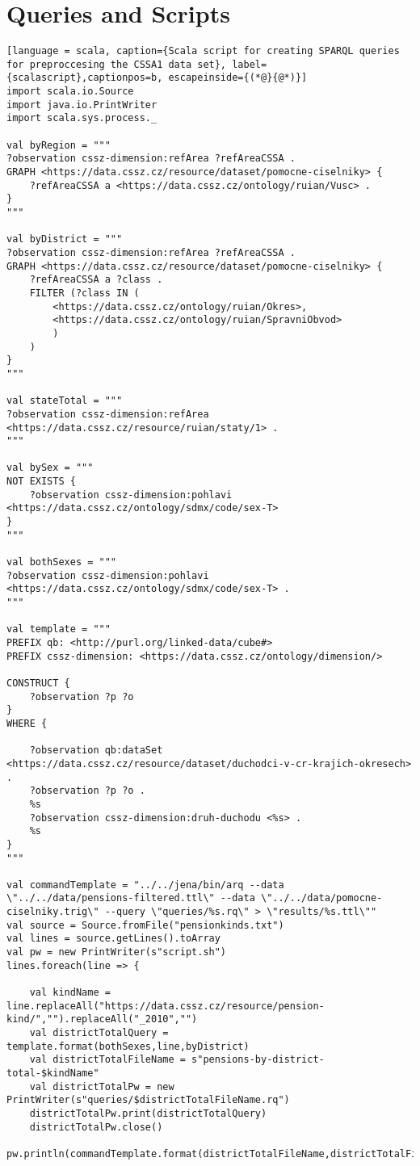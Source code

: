 \chapter{Queries and Scripts}

\begin{lstlisting}[language = scala, caption={Scala script for creating SPARQL queries for preproccesing the CSSA1 data set}, label={scalascript},captionpos=b, escapeinside={(*@}{@*)}]
import scala.io.Source
import java.io.PrintWriter
import scala.sys.process._
    
val byRegion = """
?observation cssz-dimension:refArea ?refAreaCSSA .
GRAPH <https://data.cssz.cz/resource/dataset/pomocne-ciselniky> {
    ?refAreaCSSA a <https://data.cssz.cz/ontology/ruian/Vusc> .
}
"""
    
val byDistrict = """
?observation cssz-dimension:refArea ?refAreaCSSA .
GRAPH <https://data.cssz.cz/resource/dataset/pomocne-ciselniky> {
    ?refAreaCSSA a ?class .
    FILTER (?class IN (
        <https://data.cssz.cz/ontology/ruian/Okres>,
        <https://data.cssz.cz/ontology/ruian/SpravniObvod>
        )
    )
}
"""
    
val stateTotal = """
?observation cssz-dimension:refArea <https://data.cssz.cz/resource/ruian/staty/1> .
"""
    
val bySex = """
NOT EXISTS {
    ?observation cssz-dimension:pohlavi <https://data.cssz.cz/ontology/sdmx/code/sex-T>
}
"""
    
val bothSexes = """
?observation cssz-dimension:pohlavi <https://data.cssz.cz/ontology/sdmx/code/sex-T> .
"""
    
val template = """
PREFIX qb: <http://purl.org/linked-data/cube#>
PREFIX cssz-dimension: <https://data.cssz.cz/ontology/dimension/>
    
CONSTRUCT {
    ?observation ?p ?o
}
WHERE {
    
    ?observation qb:dataSet <https://data.cssz.cz/resource/dataset/duchodci-v-cr-krajich-okresech> .
    ?observation ?p ?o .
    %s
    ?observation cssz-dimension:druh-duchodu <%s> .
    %s
}
"""
    
val commandTemplate = "../../jena/bin/arq --data \"../../data/pensions-filtered.ttl\" --data \"../../data/pomocne-ciselniky.trig\" --query \"queries/%s.rq\" > \"results/%s.ttl\""
val source = Source.fromFile("pensionkinds.txt")
val lines = source.getLines().toArray
val pw = new PrintWriter(s"script.sh") 
lines.foreach(line => {
        
    val kindName = line.replaceAll("https://data.cssz.cz/resource/pension-kind/","").replaceAll("_2010","")
    val districtTotalQuery = template.format(bothSexes,line,byDistrict)
    val districtTotalFileName = s"pensions-by-district-total-$kindName"
    val districtTotalPw = new PrintWriter(s"queries/$districtTotalFileName.rq")
    districtTotalPw.print(districtTotalQuery)
    districtTotalPw.close()
    pw.println(commandTemplate.format(districtTotalFileName,districtTotalFileName))
    

\end{lstlisting}
